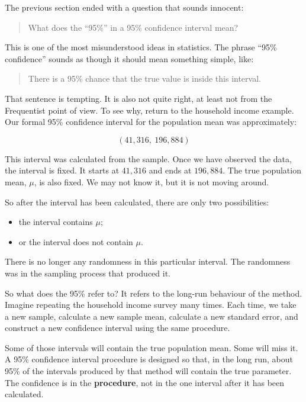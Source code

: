 \documentclass[
  letterpaper,
  DIV=11,
  numbers=noendperiod]{scrreprt}
\providecommand{\tightlist}{%
  \setlength{\itemsep}{0pt}\setlength{\parskip}{0pt}}
\begin{document}
The previous section ended with a question that sounds innocent:

\begin{quote}
What does the ``95\%'' in a 95\% confidence interval mean?
\end{quote}

This is one of the most misunderstood ideas in statistics. The phrase
``95\% confidence'' sounds as though it should mean something simple,
like:

\begin{quote}
There is a 95\% chance that the true value is inside this interval.
\end{quote}

That sentence is tempting. It is also not quite right, at least not from
the Frequentist point of view. To see why, return to the household
income example. Our formal 95\% confidence interval for the population
mean was approximately:

\[
(41{,}316,\ 196{,}884)
\]

This interval was calculated from the sample. Once we have observed the
data, the interval is fixed. It starts at \(41{,}316\) and ends at
\(196{,}884\). The true population mean, \(\mu\), is also fixed. We may
not know it, but it is not moving around.

So after the interval has been calculated, there are only two
possibilities:

\begin{itemize}
\tightlist
\item
  the interval contains \(\mu\);
\item
  or the interval does not contain \(\mu\).
\end{itemize}

There is no longer any randomness in this particular interval. The
randomness was in the sampling process that produced it.

So what does the 95\% refer to? It refers to the long-run behaviour of
the method. Imagine repeating the household income survey many times.
Each time, we take a new sample, calculate a new sample mean, calculate
a new standard error, and construct a new confidence interval using the
same procedure.

Some of those intervals will contain the true population mean. Some will
miss it. A 95\% confidence interval procedure is designed so that, in
the long run, about 95\% of the intervals produced by that method will
contain the true parameter. The confidence is in the \textbf{procedure},
not in the one interval after it has been calculated.
\end{document}
